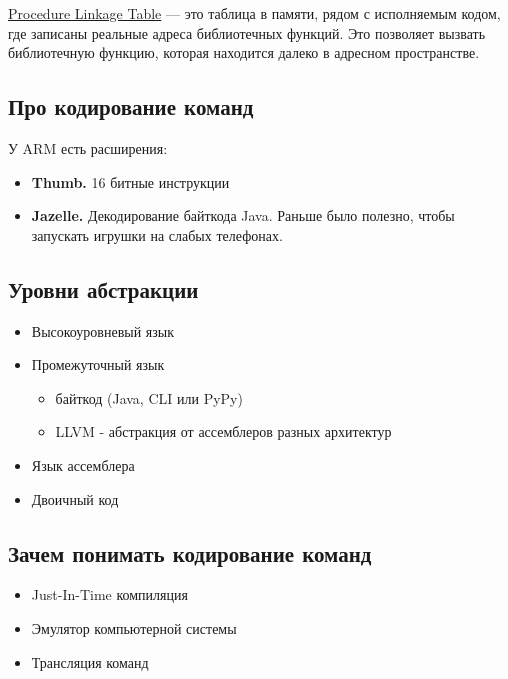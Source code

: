 \begin{Def}
	\underline{Procedure Linkage Table} --- это таблица в памяти, рядом с исполняемым кодом, где записаны реальные адреса библиотечных функций. Это позволяет вызвать библиотечную функцию, которая находится далеко в адресном пространстве.
\end{Def}

\subsection{Про кодирование команд}

У ARM есть расширения:
\begin{itemize}
	\item \textbf{Thumb.} 16 битные инструкции
	\item \textbf{Jazelle.} Декодирование байткода Java. Раньше было полезно, 
	чтобы запускать игрушки на слабых телефонах.
\end{itemize}

\subsection{Уровни абстракции}

\begin{itemize}
	\item Высокоуровневый язык
	\item Промежуточный язык
		\begin{itemize}
			\item байткод (Java, CLI или PyPy)
			\item LLVM - абстракция от ассемблеров разных архитектур
		\end{itemize}
	\item Язык ассемблера
	\item Двоичный код
\end{itemize}

\subsection{Зачем понимать кодирование команд}

\begin{itemize}
	\item Just-In-Time компиляция
	\item Эмулятор компьютерной системы
	\item Трансляция команд
\end{itemize}

